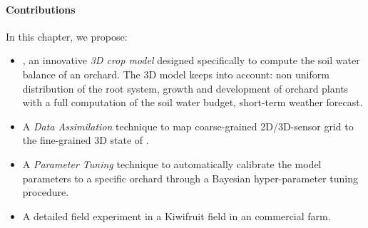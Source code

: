 


\paragraph{Contributions} In this chapter, we propose:
\begin{itemize}
	\item \olab{}, an innovative \textit{3D crop model} designed specifically to compute the soil water balance of an orchard.
    The 3D model keeps into account: non uniform distribution of the root system, growth and development of orchard plants with a full computation of the soil water budget, short-term weather forecast.
    \item A \textit{Data Assimilation} technique to map coarse-grained 2D/3D-sensor grid to the fine-grained 3D state of \olab{}.
    \item A \textit{Parameter Tuning} technique to automatically calibrate the model parameters to a specific orchard through a Bayesian hyper-parameter tuning procedure.
	\item A detailed field experiment in a Kiwifruit field in an commercial farm.
\end{itemize}


